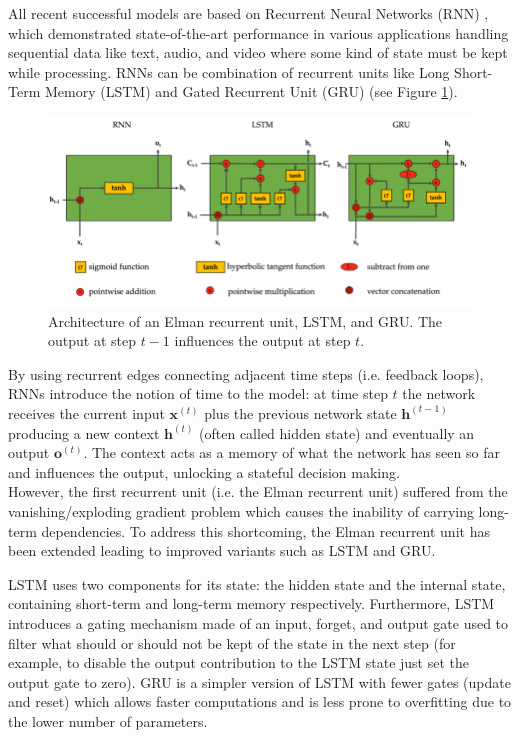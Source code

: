 \documentclass[a4paper, 12pt]{article} %
\begin{document}
	All recent successful models are based on Recurrent Neural Networks (RNN) \cite{RNN, RNNForecasting}, which demonstrated state-of-the-art performance in various applications handling sequential data like text, audio, and video where some kind of state must be kept while processing. RNNs can be combination of recurrent units like Long Short-Term Memory (LSTM) and Gated Recurrent Unit (GRU) (see Figure \ref{fig:lstmgru}). 
	\begin{figure}
		\includegraphics[width=\linewidth]{img/rnns.png}
		\caption{Architecture of an Elman recurrent unit, LSTM, and GRU. The output at step $t-1$ influences the output at step $t$.}
		\label{fig:lstmgru}
	\end{figure}
	By using recurrent edges connecting adjacent time steps (i.e. feedback loops), RNNs introduce the notion of time to the model: at time step $t$ the network receives the current input $\pmb{x}^{(t)}$ plus the previous network state $\pmb{h}^{(t-1)}$ producing a new context $\pmb{h}^{(t)}$ (often called hidden state) and eventually an output $\pmb{o}^{(t)}$.
	The context acts as a memory of what the network has seen so far and influences the output, unlocking a stateful decision making.\\
	However, the first recurrent unit (i.e. the Elman recurrent unit) suffered from the vanishing/exploding gradient problem \cite{VanishingGradient} which causes the inability of carrying long-term dependencies. To address this shortcoming, the Elman recurrent unit has been extended leading to improved variants such as LSTM and GRU.
	
	LSTM uses two components for its state: the hidden state and the internal state, containing short-term and long-term memory respectively. Furthermore, LSTM introduces a gating mechanism made of an input, forget, and output gate used to filter what should or should not be kept of the state in the next step (for example, to disable the output contribution to the LSTM state just set the output gate to zero). GRU is a simpler version of LSTM with fewer gates (update and reset) which allows faster computations and is less prone to overfitting due to the lower number of parameters.
	
\end{document}
